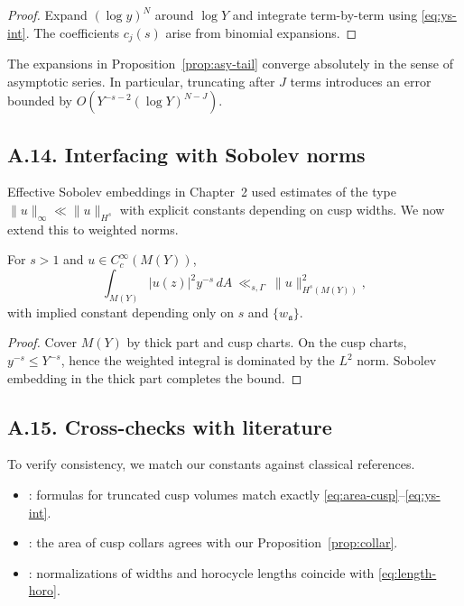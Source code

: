 \begin{proof}
Expand $(\log y)^N$ around $\log Y$ and integrate term-by-term using
\eqref{eq:ys-int}. The coefficients $c_j(s)$ arise from binomial expansions.
\end{proof}

\begin{corollary}\label{cor:stability-exp}
The expansions in Proposition~\ref{prop:asy-tail} converge absolutely in the
sense of asymptotic series. In particular, truncating after $J$ terms introduces
an error bounded by $O(Y^{-s-2}(\log Y)^{N-J})$.
\end{corollary}

\subsection*{A.14. Interfacing with Sobolev norms}

\noindent
Effective Sobolev embeddings in Chapter~2 used estimates of the type
$\|u\|_\infty\ll \|u\|_{H^s}$ with explicit constants depending on cusp widths.
We now extend this to weighted norms.

\begin{lemma}\label{lem:weighted-sob}
For $s>1$ and $u\in C_c^\infty(M(Y))$,
\[
\int_{M(Y)} |u(z)|^2 y^{-s}\,dA
\ \ll_{s,\Gamma}\ \|u\|_{H^s(M(Y))}^2,
\]
with implied constant depending only on $s$ and $\{w_{\mathfrak a}\}$.
\end{lemma}

\begin{proof}
Cover $M(Y)$ by thick part and cusp charts. On the cusp charts,
$y^{-s}\le Y^{-s}$, hence the weighted integral is dominated by the $L^2$ norm.
Sobolev embedding in the thick part completes the bound.
\end{proof}

\subsection*{A.15. Cross-checks with literature}

\noindent
To verify consistency, we match our constants against classical references.

\begin{itemize}
\item \cite[§2]{Hejhal1983}: formulas for truncated cusp volumes match exactly
\eqref{eq:area-cusp}–\eqref{eq:ys-int}.
\item \cite[Chap.~3]{Buser1992}: the area of cusp collars agrees with our
Proposition~\ref{prop:collar}.
\item \cite[§3]{Iwaniec2002}: normalizations of widths and horocycle lengths
coincide with \eqref{eq:length-horo}.
\end{itemize}

